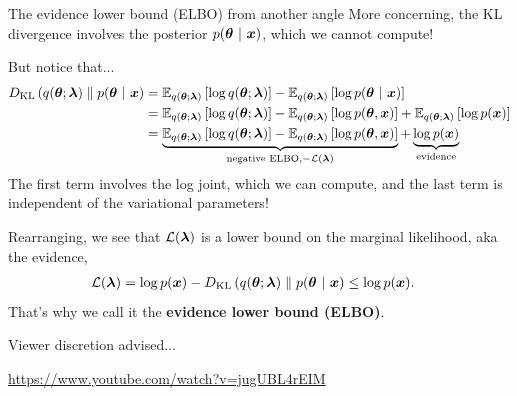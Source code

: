 \documentclass[aspectratio=169]{beamer}
\begin{document}
\begin{frame}{The evidence lower bound (ELBO) from another angle}
        More concerning, the KL divergence involves the posterior $p(\boldsymbol{\theta} ~\vert~ \boldsymbol{x})$, which we cannot compute!
        
        But notice that...
        \begin{align*}
            D_{\textrm{KL}}\left(q(\boldsymbol{\theta}; \boldsymbol{\lambda})\;\|\;p(\boldsymbol{\theta} ~\vert~ \boldsymbol{x}\right)
            &= \mathbb{E}_{q(\boldsymbol{\theta}; \boldsymbol{\lambda})} \left[ \log q(\boldsymbol{\theta}; \boldsymbol{\lambda}) \right] 
            - \mathbb{E}_{q(\boldsymbol{\theta}; \boldsymbol{\lambda})} \left[ \log p(\boldsymbol{\theta} ~\vert~ \boldsymbol{x}) \right] \\
            &= \mathbb{E}_{q(\boldsymbol{\theta}; \boldsymbol{\lambda})} \left[ \log q(\boldsymbol{\theta}; \boldsymbol{\lambda}) \right] 
            - \mathbb{E}_{q(\boldsymbol{\theta}; \boldsymbol{\lambda})} \left[ \log p(\boldsymbol{\theta}, \boldsymbol{x}) \right] 
            + \mathbb{E}_{q(\boldsymbol{\theta}; \boldsymbol{\lambda})}\left[ \log p(\boldsymbol{x})\right] \\
            &= \underbrace{\mathbb{E}_{q(\boldsymbol{\theta}; \boldsymbol{\lambda})} \left[ \log q(\boldsymbol{\theta}; \boldsymbol{\lambda}) \right] 
            - \mathbb{E}_{q(\boldsymbol{\theta}; \boldsymbol{\lambda})} \left[ \log p(\boldsymbol{\theta}, \boldsymbol{x}) \right]}_{\text{negative ELBO}, -\mathcal{L}(\boldsymbol{\lambda})}
            + \underbrace{\log p(\boldsymbol{x})}_{\text{evidence}}
        \end{align*}
    The first term involves the log joint, which we can compute, and the last term is independent of the variational parameters! 
    
    Rearranging, we see that $\mathcal{L}(\boldsymbol{\lambda})$ is a lower bound on the marginal likelihood, aka the evidence,
    \begin{align*}
        \mathcal{L}(\boldsymbol{\lambda}) &= \log p(\boldsymbol{x}) - D_{\textrm{KL}}\left(q(\boldsymbol{\theta}; \boldsymbol{\lambda})\;\|\;p(\boldsymbol{\theta} ~\vert~ \boldsymbol{x}\right) 
        \leq \log p(\boldsymbol{x}).
    \end{align*}
    That's why we call it the \textbf{evidence lower bound (ELBO)}.
\end{frame}
    
\begin{frame}{Viewer discretion advised...}
    
    \centering
    \url{https://www.youtube.com/watch?v=jugUBL4rEIM}
    
\end{frame}
\end{document}

